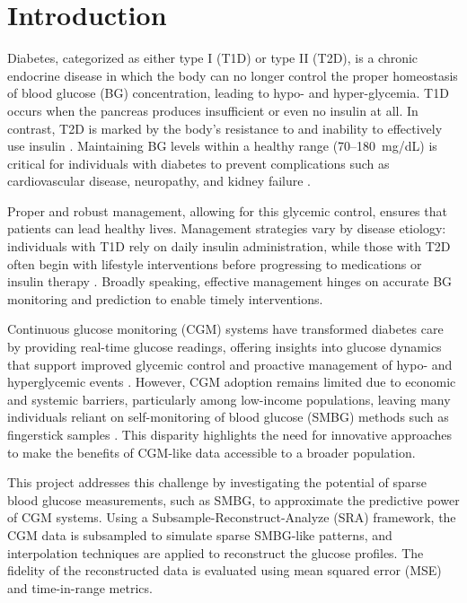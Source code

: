 
\section{Introduction}

Diabetes, categorized as either type I (T1D) or type II (T2D), is a chronic endocrine disease in which the body can no longer control the proper homeostasis of blood glucose (BG) concentration, leading to hypo-  and hyper-glycemia. T1D occurs when the pancreas produces insufficient or even no insulin at all. In contrast, T2D is marked by the body's resistance to and inability to effectively use insulin \cite{world_health_organization_global_2016}. Maintaining BG levels within a healthy range (70--180~mg/dL) is critical for individuals with diabetes to prevent complications such as cardiovascular disease, neuropathy, and kidney failure \cite{ADATIR, Roglic2016}. 

Proper and robust management, allowing for this glycemic control, ensures that patients can lead healthy lives. Management strategies vary by disease etiology: individuals with T1D rely on daily insulin administration, while those with T2D often begin with lifestyle interventions before progressing to medications or insulin therapy \cite{Roglic2016}. Broadly speaking, effective management hinges on accurate BG monitoring and prediction to enable timely interventions.

Continuous glucose monitoring (CGM) systems have transformed diabetes care by providing real-time glucose readings, offering insights into glucose dynamics that support improved glycemic control and proactive management of hypo- and hyperglycemic events \cite{Heinemann2018, Beck2017, Battelino2019}. However, CGM adoption remains limited due to economic and systemic barriers, particularly among low-income populations, leaving many individuals reliant on self-monitoring of blood glucose (SMBG) methods such as fingerstick samples \cite{Oser2021, ADA}. This disparity highlights the need for innovative approaches to make the benefits of CGM-like data accessible to a broader population.

This project addresses this challenge by investigating the potential of sparse blood glucose measurements, such as SMBG, to approximate the predictive power of CGM systems. Using a Subsample-Reconstruct-Analyze (SRA) framework, the CGM data is subsampled to simulate sparse SMBG-like patterns, and interpolation techniques are applied to reconstruct the glucose profiles. The fidelity of the reconstructed data is evaluated using mean squared error (MSE) and time-in-range metrics. 

